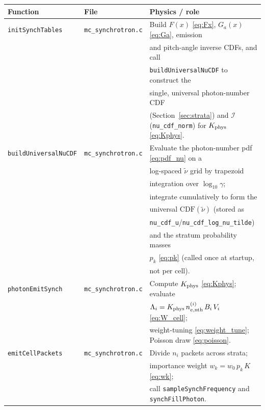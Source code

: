 \documentclass[12pt,a4paper]{article}
\newcommand{\nuth}{\tilde{\nu}}
\newcommand{\nenth}{n_{e,\mathrm{nth}}}
\newcommand{\code}[1]{\texttt{#1}}
\begin{document}
\begin{table}[h]
	\centering
	\caption{Emission call chain.}
	\label{tab:callchain_emit}
	\renewcommand{\arraystretch}{1.4}
	\begin{longtable}{p{} p{} p{}}
		\toprule
		\textbf{Function} & \textbf{File} & \textbf{Physics / role} \\
		\midrule
		\code{initSynchTables}
		& \code{mc\_synchrotron.c}
		& Build $F(x)$ \eqref{eq:Fx}, $G_a(x)$ \eqref{eq:Ga}, emission \\
		& & and pitch-angle inverse CDFs, and call \\
		& & \code{buildUniversalNuCDF} to construct the \\
		& & single, universal photon-number CDF \\
		& & (Section~\ref{sec:strata}) and $\mathcal{I}$
		(\code{nu\_cdf\_norm}) for $K_{\rm phys}$
		\eqref{eq:Kphys}. \\
		\midrule
		\code{buildUniversalNuCDF}
		& \code{mc\_synchrotron.c}
		& Evaluate the photon-number pdf
		\eqref{eq:pdf_nu} on a \\
		& & log-spaced $\nuth$ grid by trapezoid \\
		& & integration over $\log_{10}\gamma$; \\
		& & integrate cumulatively to form the \\
		& & universal $\mathrm{CDF}(\nuth)$ (stored as \\
		& & \code{nu\_cdf\_u}/\code{nu\_cdf\_log\_nu\_tilde}) \\
		& & and the stratum probability masses \\
		& & $p_k$ \eqref{eq:pk} (called once at startup, \\
		& & not per cell). \\
		\midrule
		\code{photonEmitSynch}
		& \code{mc\_synchrotron.c}
		& Compute $K_{\rm phys}$ \eqref{eq:Kphys}; evaluate \\
		& & $\Lambda_i = K_{\rm phys}\,\nenth^{(i)}\,B_i\,V_i$
		\eqref{eq:W_cell}; \\
		& & weight-tuning \eqref{eq:weight_tune};
		Poisson draw \eqref{eq:poisson}. \\
		\midrule
		\code{emitCellPackets}
		& \code{mc\_synchrotron.c}
		& Divide $n_i$ packets across strata; \\
		& & importance weight $w_k = w_0\,p_k\,K$ \eqref{eq:wk}; \\
		& & call \code{sampleSynchFrequency} and
		\code{synchFillPhoton}. \\

\end{longtable}
\end{table}
\end{document}
